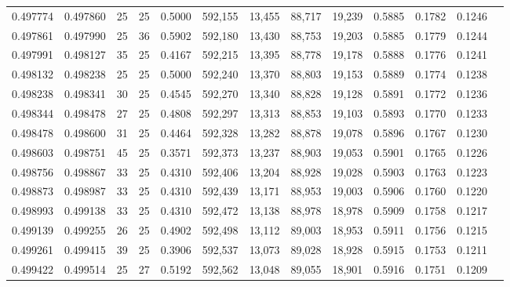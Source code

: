 \begin{tabular}{rrrrrrrrrrrrr}
0.497774 & 0.497860 &    25 &  25 &                                     0.5000 & 592,155 &  13,455 &  88,717 &  19,239 & 0.5885 & 0.1782 & 0.1246 \\
0.497861 & 0.497990 &    25 &  36 &                                     0.5902 & 592,180 &  13,430 &  88,753 &  19,203 & 0.5885 & 0.1779 & 0.1244 \\
0.497991 & 0.498127 &    35 &  25 &                                     0.4167 & 592,215 &  13,395 &  88,778 &  19,178 & 0.5888 & 0.1776 & 0.1241 \\
0.498132 & 0.498238 &    25 &  25 &                                     0.5000 & 592,240 &  13,370 &  88,803 &  19,153 & 0.5889 & 0.1774 & 0.1238 \\
0.498238 & 0.498341 &    30 &  25 &                                     0.4545 & 592,270 &  13,340 &  88,828 &  19,128 & 0.5891 & 0.1772 & 0.1236 \\
0.498344 & 0.498478 &    27 &  25 &                                     0.4808 & 592,297 &  13,313 &  88,853 &  19,103 & 0.5893 & 0.1770 & 0.1233 \\
0.498478 & 0.498600 &    31 &  25 &                                     0.4464 & 592,328 &  13,282 &  88,878 &  19,078 & 0.5896 & 0.1767 & 0.1230 \\
0.498603 & 0.498751 &    45 &  25 &                                     0.3571 & 592,373 &  13,237 &  88,903 &  19,053 & 0.5901 & 0.1765 & 0.1226 \\
0.498756 & 0.498867 &    33 &  25 &                                     0.4310 & 592,406 &  13,204 &  88,928 &  19,028 & 0.5903 & 0.1763 & 0.1223 \\
0.498873 & 0.498987 &    33 &  25 &                                     0.4310 & 592,439 &  13,171 &  88,953 &  19,003 & 0.5906 & 0.1760 & 0.1220 \\
0.498993 & 0.499138 &    33 &  25 &                                     0.4310 & 592,472 &  13,138 &  88,978 &  18,978 & 0.5909 & 0.1758 & 0.1217 \\
0.499139 & 0.499255 &    26 &  25 &                                     0.4902 & 592,498 &  13,112 &  89,003 &  18,953 & 0.5911 & 0.1756 & 0.1215 \\
0.499261 & 0.499415 &    39 &  25 &                                     0.3906 & 592,537 &  13,073 &  89,028 &  18,928 & 0.5915 & 0.1753 & 0.1211 \\
0.499422 & 0.499514 &    25 &  27 &                                     0.5192 & 592,562 &  13,048 &  89,055 &  18,901 & 0.5916 & 0.1751 & 0.1209 \\

\end{tabular}
